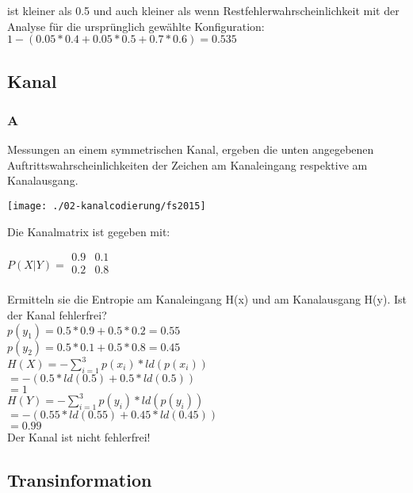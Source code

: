 ist kleiner als 0.5 und auch kleiner als wenn Restfehlerwahrscheinlichkeit mit der Analyse für 	die ursprünglich gewählte Konfiguration:\\
$1 - (0.05*0.4 + 0.05*0.5 + 0.7*0.6) = 0.535$

\subsection{Kanal}
\subsubsection{A}
Messungen an einem symmetrischen Kanal, ergeben die unten angegebenen Auftrittswahrscheinlichkeiten der Zeichen am Kanaleingang respektive am Kanalausgang.\\
\begin{center}
    \vspace{-8pt}
    \texttt{[image: ./02-kanalcodierung/fs2015]}
    \vspace{-8pt}
\end{center}

Die Kanalmatrix ist gegeben mit:

$P(X|Y) = \begin{matrix}
    0.9 & 0.1\\
    0.2 & 0.8\\
\end{matrix}$

Ermitteln sie die Entropie am Kanaleingang H(x) und am Kanalausgang H(y). Ist der Kanal fehlerfrei?\\
$p(y_1)=0.5*0.9+0.5*0.2=0.55$\\
$p(y_2)=0.5*0.1+0.5*0.8=0.45$\\

$H(X)=-\sum_{i=1}^3p(x_i)*ld(p(x_i))$\\
$=-(0.5*ld(0.5)+0.5*ld(0.5))$\\
$=1$\\

$H(Y)=-\sum_{i=1}^3p(y_i)*ld(p(y_i))$\\
$=-(0.55*ld(0.55)+0.45*ld(0.45))$\\
$=0.99$\\

Der Kanal ist nicht fehlerfrei!

\columnbreak

\subsection{Transinformation}
